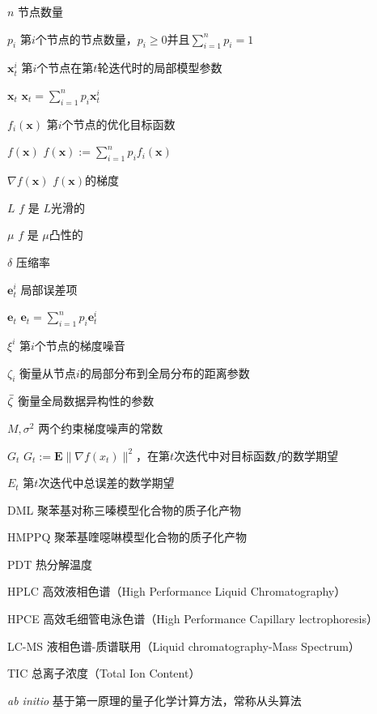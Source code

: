 
\begin{denotation}[3cm]
  \item[$n$] 节点数量
  \item[$p_i$] 第$i$个节点的节点数量，$p_i \geq 0$并且$\sum_{i=1}^{n}p_i=1$
  \item[$\textbf{x}_t^{i}$] 第$i$个节点在第$t$轮迭代时的局部模型参数
  \item[$\textbf{x}_t$] $\textbf{x}_t=\sum_{i=1}^{n}p_i\textbf{x}_t^{i}$
  \item[$f_i(\textbf{x})$] 第$i$个节点的优化目标函数
  \item[$f(\textbf{x})$] $f(\textbf{x}):=\sum_{i=1}^{n}p_if_i(\textbf{x})$
  \item[$\nabla f(\textbf{x})$] $f(\textbf{x})$的梯度
  \item[$L$] $f$ 是 $L$光滑的
  \item[$\mu$] $f$ 是 $\mu$凸性的
  \item[$\delta$] 压缩率
  \item[$\textbf{e}_t^{i}$] 局部误差项
  \item[$\textbf{e}_t$]  $\textbf{e}_t=\sum_{i=1}^{n}p_i\textbf{e}_t^{i}$
  \item[$\xi^i$] 第$i$个节点的梯度噪音
  \item[$\zeta_i$] 衡量从节点$i$的局部分布到全局分布的距离参数
  \item[$\Bar{\zeta}$] 衡量全局数据异构性的参数
  \item[$M,\sigma^2$] 两个约束梯度噪声的常数
  \item[$G_t$] $G_t:=\textbf{E}\lVert \nabla f(x_t)\rVert^2$，在第$t$次迭代中对目标函数$f$的数学期望
  \item[$E_t$] 第$t$次迭代中总误差的数学期望
  \iffalse
  \item[DML] 聚苯基对称三嗪模型化合物的质子化产物
  \item[HMPPQ] 聚苯基喹噁啉模型化合物的质子化产物
  \item[PDT] 热分解温度
  \item[HPLC] 高效液相色谱（High Performance Liquid Chromatography）
  \item[HPCE] 高效毛细管电泳色谱（High Performance Capillary lectrophoresis）
  \item[LC-MS] 液相色谱-质谱联用（Liquid chromatography-Mass Spectrum）
  \item[TIC] 总离子浓度（Total Ion Content）
  \item[\textit{ab initio}] 基于第一原理的量子化学计算方法，常称从头算法

\end{denotation}
